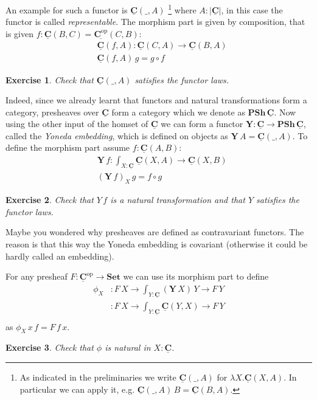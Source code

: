 \documentclass{article}
\newcommand{\Set}{\mathbf{Set}}
\newcommand{\cat}[1]{\underline{\mathbf{#1}}}
\newcommand{\obj}[1]{|#1|}
\newcommand{\homC}[3]{\cat{#1}(#2,#3)}
\newcommand{\op}{\mathrm{op}}
\newcommand{\Y}{\mathbf{Y}}
\newcommand{\PSh}{\mathbf{PSh}}
\newtheorem{exercise}{Exercise}
\begin{document}
An example for such a functor is $\homC{C}{\_}{A}$
\footnote{As indicated in the preliminaries we write $\homC{C}{\_}{A}$ for $\lambda X.\homC{C}{X}{A}$. In particular we can apply it, e.g. $\homC{C}{\_}{A}\,B = \homC{C}{B}{A}$.}
 where $A:\obj{\cat{C}}$, in this case the functor is called \emph{representable}. The morphism part is given by composition, that is given $f:\homC{C}{B}{C} = \homC{C^\op}{C}{B}$:
\begin{align*}
&\homC{C}{f}{A} : \homC{C}{C}{A} \to \homC{C}{B}{A} \\
&\homC{C}{f}{A} \,g =  g \circ f
\end{align*}
\begin{exercise}
  Check that $\homC{C}{\_}{A}$ satisfies the functor laws.
\end{exercise}
Indeed, since we already learnt that functors and natural transformations form a category, presheaves over $\cat{C}$ form a category which we denote as $\PSh\,\cat{C}$. Now using the other input of the homset of $\cat{C}$ we can form a functor $\Y : \cat{C} \to \PSh\,\cat{C}$, called the \emph{Yoneda embedding}, which is defined on objects as $\Y\,A = \homC{C}{\_}{A}$. To define the morphism part assume $f:\homC{C}{A}{B}$:
\begin{align*}
& \Y\,f :  \int_{X:\cat{C}}\homC{C}{X}{A} \to \homC{C}{X}{B} \\
& (\Y\,f)_X\,g = f \circ g
\end{align*}
\begin{exercise}
  Check that $Y\,f$ is a natural transformation and that $Y$ satisfies the functor laws.
\end{exercise}
Maybe you wondered why presheaves are defined as contravariant functors. The reason is that this way the Yoneda embedding is covariant (otherwise it could be hardly called an embedding).

For any presheaf $F : \cat{C}^\op\to\Set$ we can use its morphism part to define
\begin{align*}
  \phi_X & : F\,X \to \int_{Y : \cat{C}} (\Y\,X)\,Y \to F\,Y \\
            & :  F\,X \to \int_{Y : \cat{C}} \cat{C}(Y,X) \to F\,Y \\
\end{align*}
as $\phi_X\,x\,f = F\,f\,x$. 
\begin{exercise}
  Check that $\phi$ is natural in $X:\cat{C}$.
\end{exercise}
\end{document}
